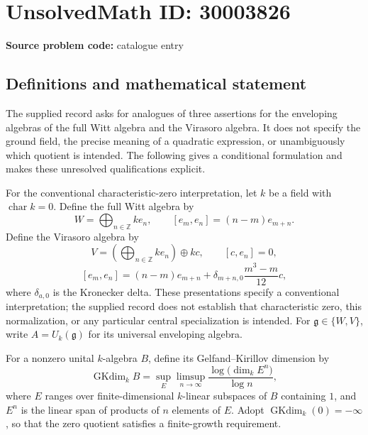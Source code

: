 \documentclass[11pt]{article}
\newcommand{\Z}{\mathbb{Z}}
\begin{document}
\section*{UnsolvedMath ID: 30003826}
\textbf{Source problem code:} catalogue entry
\subsection{Definitions and mathematical statement}
The supplied record asks for analogues of three assertions for the enveloping algebras of the full Witt algebra and the Virasoro algebra. It does not specify the ground field, the precise meaning of a quadratic expression, or unambiguously which quotient is intended. The following gives a conditional formulation and makes these unresolved qualifications explicit.

For the conventional characteristic-zero interpretation, let \(k\) be a field with \(\operatorname{char}k=0\). Define the full Witt algebra by
\[
W=\bigoplus_{n\in\Z}ke_n,
\qquad [e_m,e_n]=(n-m)e_{m+n}.
\]
Define the Virasoro algebra by
\[
V=\left(\bigoplus_{n\in\Z}ke_n\right)\oplus kc,
\qquad [c,e_n]=0,
\]
\[
[e_m,e_n]=(n-m)e_{m+n}
 +\delta_{m+n,0}\frac{m^3-m}{12}c,
\]
where \(\delta_{a,0}\) is the Kronecker delta. These presentations specify a conventional interpretation; the supplied record does not establish that characteristic zero, this normalization, or any particular central specialization is intended. For \(\mathfrak g\in\{W,V\}\), write \(A=U_k(\mathfrak g)\) for its universal enveloping algebra.

For a nonzero unital \(k\)-algebra \(B\), define its Gelfand--Kirillov dimension by
\[
\operatorname{GKdim}_k B
 =\sup_E\limsup_{n\to\infty}
 \frac{\log\bigl(\dim_k E^n\bigr)}{\log n},
\]
where \(E\) ranges over finite-dimensional \(k\)-linear subspaces of \(B\) containing \(1\), and \(E^n\) is the linear span of products of \(n\) elements of \(E\). Adopt \(\operatorname{GKdim}_k(0)=-\infty\), so that the zero quotient satisfies a finite-growth requirement.
\end{document}
